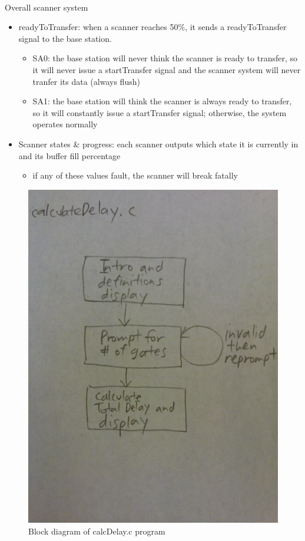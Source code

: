 \documentclass{article}
\begin{document}
  \paragraph{} Overall scanner system
  \begin{itemize}
    \item readyToTransfer: when a scanner reaches 50\%, it sends a readyToTransfer signal to the base station.
    \begin{itemize}
      \item SA0: the base station will never think the scanner is ready to transfer, so it will never issue a startTransfer signal and the scanner system will never tranfer its data (always flush)
      \item SA1: the base station will think the scanner is always ready to transfer, so it will constantly issue a startTransfer signal; otherwise, the system operates normally
    \end{itemize}

    \item Scanner states \& progress: each scanner outputs which state it is currently in and its buffer fill percentage
    \begin{itemize}
      \item if any of these values fault, the scanner will break fatally
    \end{itemize}
  \end{itemize}

  \begin{figure}[H]
    \centering
    \includegraphics[width=0.75\linewidth]{figures/c/calcDelay_blockdiagram.jpg}
    \caption{Block diagram of calcDelay.c program}
    \label{fig:calcDelay_blockdiagram}
  \end{figure}
\end{document}
